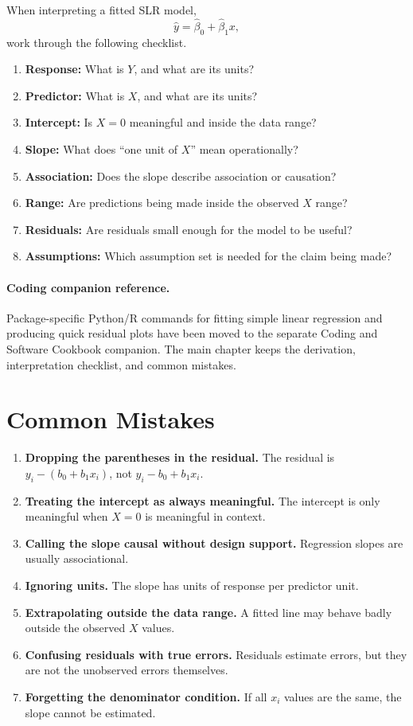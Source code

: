 When interpreting a fitted SLR model,
\begin{equation}
  \widehat{y}=\widehat{\beta}_0+\widehat{\beta}_1x,
\end{equation}
work through the following checklist.

\begin{enumerate}
  \item \textbf{Response:} What is $Y$, and what are its units?
  \item \textbf{Predictor:} What is $X$, and what are its units?
  \item \textbf{Intercept:} Is $X=0$ meaningful and inside the data range?
  \item \textbf{Slope:} What does ``one unit of $X$'' mean operationally?
  \item \textbf{Association:} Does the slope describe association or causation?
  \item \textbf{Range:} Are predictions being made inside the observed $X$ range?
  \item \textbf{Residuals:} Are residuals small enough for the model to be useful?
  \item \textbf{Assumptions:} Which assumption set is needed for the claim being made?
\end{enumerate}


\paragraph{Coding companion reference.}
Package-specific Python/R commands for fitting simple linear regression and producing quick residual plots have been moved to the separate Coding and Software Cookbook companion.  The main chapter keeps the derivation, interpretation checklist, and common mistakes.

\section{Common Mistakes}

\begin{enumerate}
  \item \textbf{Dropping the parentheses in the residual.}  The residual is $y_i-(b_0+b_1x_i)$, not $y_i-b_0+b_1x_i$.
  \item \textbf{Treating the intercept as always meaningful.}  The intercept is only meaningful when $X=0$ is meaningful in context.
  \item \textbf{Calling the slope causal without design support.}  Regression slopes are usually associational.
  \item \textbf{Ignoring units.}  The slope has units of response per predictor unit.
  \item \textbf{Extrapolating outside the data range.}  A fitted line may behave badly outside the observed $X$ values.
  \item \textbf{Confusing residuals with true errors.}  Residuals estimate errors, but they are not the unobserved errors themselves.
  \item \textbf{Forgetting the denominator condition.}  If all $x_i$ values are the same, the slope cannot be estimated.
\end{enumerate}

